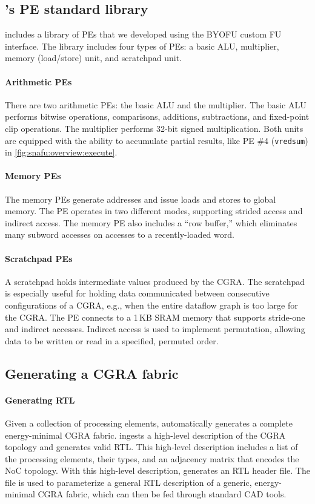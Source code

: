 \subsection{\snafuframe's PE standard library}
\snafuframe includes a library of PEs that we developed using the BYOFU custom
FU interface.  
% 
The library includes four types of PEs: a basic ALU, multiplier, memory 
(load/store) unit, and scratchpad unit.

\paragraph{Arithmetic PEs}
There are two arithmetic PEs: the basic ALU and the multiplier.
% 
The basic ALU performs bitwise operations, comparisons, additions, subtractions, and fixed-point clip operations.
% 
The multiplier performs 32-bit signed multiplication.
% 
Both units are equipped with the ability to accumulate partial results,
like PE \#4 ({\tt vredsum}) in \autoref{fig:snafu:overview:execute}. 

\paragraph{Memory PEs}
The memory PEs generate addresses and issue loads and stores to global memory.
% 
The PE operates in two different modes, supporting strided access and indirect access.
% 
The memory PE also includes a ``row buffer,'' which eliminates many subword accesses on accesses to a recently-loaded word.

\paragraph{Scratchpad PEs}
A scratchpad holds intermediate values produced by the CGRA. 
%
The scratchpad is especially useful for holding data communicated between
consecutive configurations of a CGRA, e.g., when the entire dataflow
graph is too large for the CGRA.
% 
The PE connects to a 1\,KB SRAM memory that supports stride-one and indirect
accesses.
% 
Indirect access is used to implement permutation, allowing data to be written
or read in a specified, permuted order.
%

\subsection{Generating a CGRA fabric}

\paragraph{Generating RTL}
Given a collection of processing elements, \snafuframe automatically generates a complete energy-minimal CGRA fabric.
% 
\snafuframe ingests a high-level description of the CGRA topology and generates valid RTL.
% 
This high-level description includes a list of the processing elements, their types, and an adjacency matrix that encodes the NoC topology.
%
With this high-level description, \snafuframe generates an RTL header file.
% 
The file is used to parameterize a general RTL description of a generic, energy-minimal CGRA fabric,
which can then be fed through standard CAD tools.
% 

